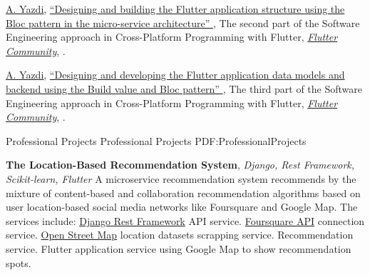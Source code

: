 \documentclass[letterpaper,MMMyyyy,nonstopmode]{resume}
\begin{document}
\begin{Body}
\BigGap
\NumberedItem{[2]}
\href{https://medium.com/@aliyazdi75}
{\underline{A. Yazdi}},
\href{https://medium.com/flutter-community/the-software-engineering-approach-in-cross-platform-programming-with-flutter-part-2-f7b75056102?source=friends_link&sk=79ed6a47bd6fe9b4247f3cc2a113e3df}
{
``Designing and building the Flutter application structure using the Bloc pattern in the micro-service architecture''
},
\newline The second part of the Software Engineering approach in Cross-Platform Programming with Flutter,
\href{https://medium.com/flutter-community}
{\textit{Flutter Community}},
.

\BigGap
\NumberedItem{[3]}
\href{https://medium.com/@aliyazdi75}
{\underline{A. Yazdi}},
\href{https://medium.com/flutter-community/the-software-engineering-approach-in-cross-platform-programming-with-flutter-part-3-34c6eff02af0}
{
``Designing and developing the Flutter application data models and backend using the Build value and Bloc pattern''
},
\newline The third part of the Software Engineering approach in Cross-Platform Programming with Flutter,
\href{https://medium.com/flutter-community}
{\textit{Flutter Community}},
.

\endgroup




\Section
{Professional\newline
Projects}
{Professional Projects}
{PDF:ProfessionalProjects}

\BulletItem
\textbf{The Location-Based Recommendation System},
\textit{\small{Django, Rest Framework, Scikit-learn, Flutter}}
\hfill
{\normalsize{
\href{https://github.com/aliyazdi75/Resume/raw/main/BScThesis-Abstract.pdf}
{\faFilePdf}
}}
\Item
A micro­service recommendation system recommends by the mixture of content­-based and collaboration recommendation algorithms based on user location­-based social media networks like Foursquare and Google Map. The services include:
\SubBulletItem
\href{https://www.django-rest-framework.org}{Django Rest Framework} API service.
\SubBulletItem
\href{https://developer.foursquare.com}{Foursquare API} connection service.
\SubBulletItem
\href{https://osm-internal.download.geofabrik.de}{Open Street Map} location datasets scrapping service.
\SubBulletItem
Recommendation service.
\SubBulletItem
Flutter application service using Google Map to show recommendation spots.


\end{Body}
\end{document}
